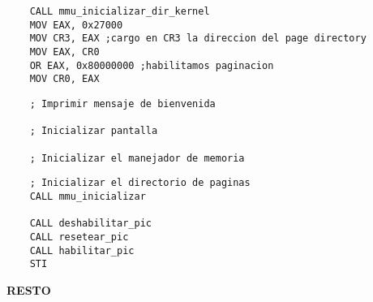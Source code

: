 \begin{codesnippet}
\begin{verbatim}
	CALL mmu_inicializar_dir_kernel
	MOV EAX, 0x27000
	MOV CR3, EAX ;cargo en CR3 la direccion del page directory
	MOV EAX, CR0
    OR EAX, 0x80000000 ;habilitamos paginacion
	MOV CR0, EAX
\end{verbatim}
\end{codesnippet}
\begin{codesnippet}
\begin{verbatim}
    ; Imprimir mensaje de bienvenida

    ; Inicializar pantalla
    
    ; Inicializar el manejador de memoria
\end{verbatim}
\end{codesnippet}
\begin{codesnippet}
\begin{verbatim}
    ; Inicializar el directorio de paginas
    CALL mmu_inicializar
    
    CALL deshabilitar_pic
    CALL resetear_pic
    CALL habilitar_pic
    STI
\end{verbatim}
\end{codesnippet}

\textbf{RESTO}
